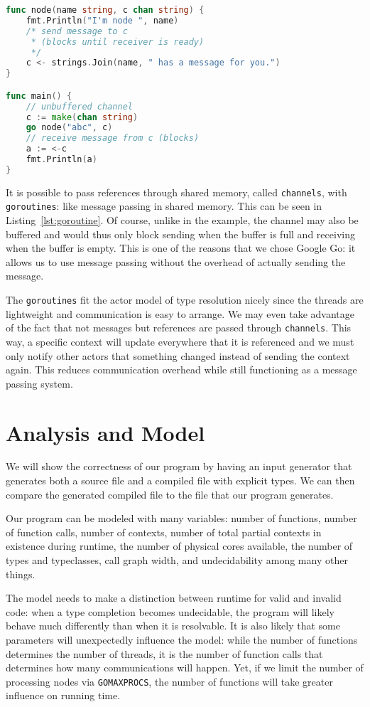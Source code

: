 \documentclass{acm_proc_article-sp}
\begin{document}
\begin{lstlisting}[caption=Small \texttt{goroutine} example with
\texttt{channels},language=Go,label=lst:goroutine]
func node(name string, c chan string) {
	fmt.Println("I'm node ", name)
	/* send message to c
	 * (blocks until receiver is ready)
	 */
	c <- strings.Join(name, " has a message for you.")
}

func main() {
	// unbuffered channel
	c := make(chan string)
	go node("abc", c)
	// receive message from c (blocks)
	a := <-c
	fmt.Println(a)
}
\end{lstlisting}

It is possible to pass references through shared memory, called
\texttt{channels}, with \texttt{goroutines}: like message passing in shared
memory. This can be seen in Listing~\ref{lst:goroutine}. Of course, unlike in
the example, the channel may also be buffered and would thus only block sending
when the buffer is full and receiving when the buffer is empty. This is one of
the reasons that we chose Google Go: it allows us to use message passing
without the overhead of actually sending the message.

The \texttt{goroutines} fit the actor model of type resolution nicely since
the threads are lightweight and communication is easy to arrange. We may even
take advantage of the fact that not messages but references are passed through
\texttt{channels}. This way, a specific context will update everywhere that it
is referenced and we must only notify other actors that something changed
instead of sending the context again. This reduces communication overhead while
still functioning as a message passing system.

\section{Analysis and Model}

We will show the correctness of our program by having an input generator that
generates both a source file and a compiled file with explicit types. We can
then compare the generated compiled file to the file that our program
generates. 

Our program can be modeled with many variables: number of functions, number of
function calls, number of contexts, number of total partial contexts in
existence during runtime, the number of physical cores available, the number of
types and typeclasses, call graph width, and undecidability among many other
things.

The model needs to make a distinction between runtime for valid and invalid
code: when a type completion becomes undecidable, the program will likely
behave much differently than when it is resolvable. It is also likely that some
parameters will unexpectedly influence the model: while the number of functions
determines the number of threads, it is the number of function calls that
determines how many communications will happen. Yet, if we limit the number of
processing nodes via \texttt{GOMAXPROCS}, the number of functions will take
greater influence on running time.
\end{document}
